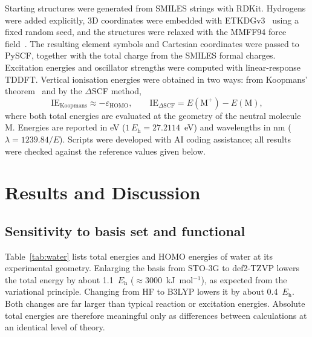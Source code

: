 \documentclass[11pt,a4paper]{article}
\begin{document}
Starting structures were generated from SMILES strings with RDKit. Hydrogens were added
explicitly, 3D coordinates were embedded with ETKDGv3~\cite{riniker2015} using a fixed random
seed, and the structures were relaxed with the MMFF94 force field~\cite{halgren1996}. The
resulting element symbols and Cartesian coordinates were passed to PySCF, together with the total
charge from the SMILES formal charges. Excitation energies and oscillator strengths were computed
with linear-response TDDFT. Vertical ionisation energies were obtained in two ways: from Koopmans'
theorem~\cite{koopmans1934} and by the $\Delta$SCF method,
\begin{equation}
  \mathrm{IE}_\text{Koopmans} \approx -\varepsilon_\text{HOMO}, \qquad
  \mathrm{IE}_{\Delta\text{SCF}} = E(\mathrm{M}^{+}) - E(\mathrm{M}),
  \label{eq:ie}
\end{equation}
where both total energies are evaluated at the geometry of the neutral molecule M. Energies are
reported in eV ($1\,E_\text{h} = 27.2114$~eV) and wavelengths in nm ($\lambda = 1239.84/E$).
Scripts were developed with AI coding assistance; all results were checked against the reference
values given below.

\section{Results and Discussion}

\subsection{Sensitivity to basis set and functional}

Table~\ref{tab:water} lists total energies and HOMO energies of water at its experimental geometry.
Enlarging the basis from STO-3G to def2-TZVP lowers the total energy by about 1.1~$E_\text{h}$
($\approx$3000~kJ~mol$^{-1}$), as expected from the variational principle. Changing from HF to B3LYP
lowers it by about 0.4~$E_\text{h}$. Both changes are far larger than typical reaction or
excitation energies. Absolute total energies are therefore meaningful only as differences between
calculations at an identical level of theory.
\end{document}
